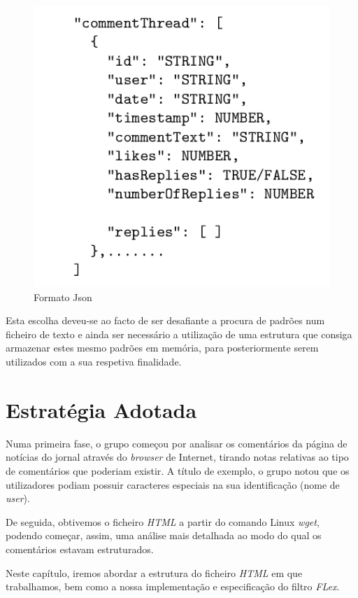 \documentclass[a4paper,12pt]{report}
\begin{document}
\begin{figure}[h]
        \centering
        \includegraphics[scale=0.5]{images/jsonStruct.png}
        \caption{Formato Json}
        \label{img:Json_Struct}
        \vspace{2.0cm}
    \end{figure}

Esta escolha deveu-se ao facto de ser desafiante a procura de padrões num ficheiro de texto e ainda ser necessário a utilização de uma estrutura que consiga armazenar estes mesmo padrões em memória, para posteriormente serem utilizados com a sua respetiva finalidade.


\chapter{Estratégia Adotada}

Numa primeira fase, o grupo começou por analisar os comentários da página de notícias do jornal através do \textit{browser} de Internet, tirando notas relativas ao tipo de comentários que poderiam existir. A título de exemplo, o grupo notou que os utilizadores podiam possuir caracteres especiais na sua identificação (nome de \textit{user}).

De seguida, obtivemos o ficheiro \textit{HTML} a partir do comando Linux \textit{wget}, podendo começar, assim, uma análise mais detalhada ao modo do qual os comentários estavam estruturados.
\par Neste capítulo, iremos abordar a estrutura do ficheiro \textit{HTML} em que trabalhamos, bem como a nossa implementação e especificação do filtro \textit{FLex}.
\end{document}
